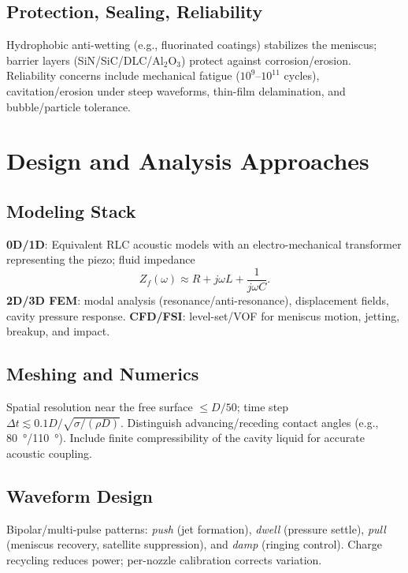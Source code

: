 \documentclass[conference]{IEEEtran}
\begin{document}
\subsection{Protection, Sealing, Reliability}
Hydrophobic anti-wetting (e.g., fluorinated coatings) stabilizes the meniscus; barrier layers (SiN/SiC/DLC/Al$_2$O$_3$) protect against corrosion/erosion. Reliability concerns include mechanical fatigue ($10^{9}$--$10^{11}$ cycles), cavitation/erosion under steep waveforms, thin-film delamination, and bubble/particle tolerance.

\section{Design and Analysis Approaches}
\subsection{Modeling Stack}
\textbf{0D/1D}: Equivalent RLC acoustic models with an electro-mechanical transformer representing the piezo; fluid impedance
\begin{equation}
Z_f(\omega)\approx R + j\omega L + \frac{1}{j\omega C}.
\end{equation}
\textbf{2D/3D FEM}: modal analysis (resonance/anti-resonance), displacement fields, cavity pressure response. 
\textbf{CFD/FSI}: level-set/VOF for meniscus motion, jetting, breakup, and impact.

\subsection{Meshing and Numerics}
Spatial resolution near the free surface $\le D/50$; time step $\Delta t \lesssim 0.1D/\sqrt{\sigma/(\rho D)}$. Distinguish advancing/receding contact angles (e.g., \SI{80}{\degree}/\SI{110}{\degree}). Include finite compressibility of the cavity liquid for accurate acoustic coupling.

\subsection{Waveform Design}
Bipolar/multi-pulse patterns: \emph{push} (jet formation), \emph{dwell} (pressure settle), \emph{pull} (meniscus recovery, satellite suppression), and \emph{damp} (ringing control). Charge recycling reduces power; per-nozzle calibration corrects variation.

\end{document}
